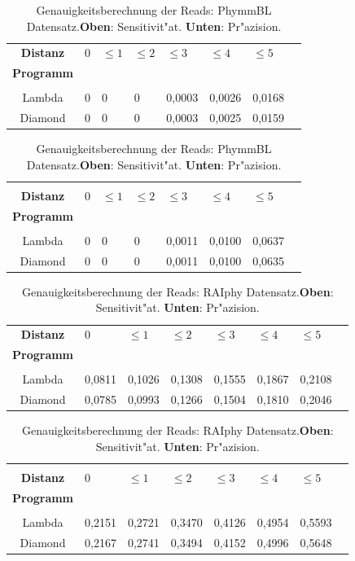\documentclass[10pt, a4paper]{article}[08.12.2015]
\begin{document}
      \begin{table}[H]
        \begin{tabular}{clllllll}
          \textbf{Distanz}&0&$\leq1$&$\leq2$&$\leq3$&$\leq4$&$\leq5$\\
          \textbf{Programm}&&&&&\\ \hline  
          &&&&&&\\
          Lambda&0&0&0&0,0003&0,0026&0,0168\\
          Diamond&0&0&0&0,0003&0,0025&0,0159\\
        \end{tabular}

        \begin{tabular}{clllllll}
        &&&&&&\\
          \textbf{Distanz}&0&$\leq1$&$\leq2$&$\leq3$&$\leq4$&$\leq5$\\
          \textbf{Programm}&&&&&\\ \hline  
          &&&&&&\\
          Lambda&0&0&0&0,0011&0,0100&0,0637\\
          Diamond&0&0&0&0,0011&0,0100&0,0635\\
        \end{tabular}
        \caption[Genauigkeitsberechnung der Reads: PhymmBL Datensatz.]{\small{Genauigkeitsberechnung der Reads: PhymmBL Datensatz.\newline \textbf{Oben}: Sensitivit"at. \textbf{Unten}: Pr"azision.} }
      \end{table}

      \begin{table}[H]
        \begin{tabular}{clllllll}
          \textbf{Distanz}&0&$\leq1$&$\leq2$&$\leq3$&$\leq4$&$\leq5$\\
          \textbf{Programm}&&&&&\\ \hline  
          &&&&&&\\
          Lambda&0,0811&0,1026&0,1308&0,1555&0,1867&0,2108\\
          Diamond&0,0785&0,0993&0,1266&0,1504&0,1810&0,2046\\
        \end{tabular}

        \begin{tabular}{clllllll}
        &&&&&&\\
          \textbf{Distanz}&0&$\leq1$&$\leq2$&$\leq3$&$\leq4$&$\leq5$\\
          \textbf{Programm}&&&&&\\ \hline  
          &&&&&&\\
          Lambda&0,2151&0,2721&0,3470&0,4126&0,4954&0,5593\\
          Diamond&0,2167&0,2741&0,3494&0,4152&0,4996&0,5648\\
        \end{tabular}
        \caption[Genauigkeitsberechnung der Reads: RAIphy Datensatz.]{\small{Genauigkeitsberechnung der Reads: RAIphy Datensatz.\newline \textbf{Oben}: Sensitivit"at. \textbf{Unten}: Pr"azision.} }
      \end{table}
         
\end{document}
